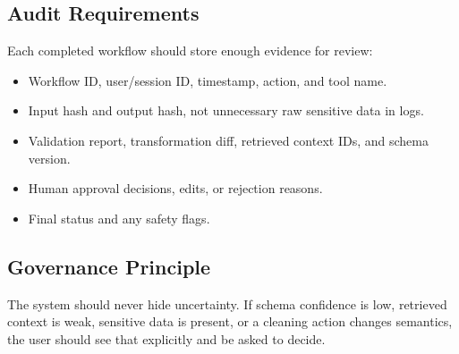 \subsection{Audit Requirements}

Each completed workflow should store enough evidence for review:

\begin{itemize}
  \item Workflow ID, user/session ID, timestamp, action, and tool name.
  \item Input hash and output hash, not unnecessary raw sensitive data in logs.
  \item Validation report, transformation diff, retrieved context IDs, and schema version.
  \item Human approval decisions, edits, or rejection reasons.
  \item Final status and any safety flags.
\end{itemize}

\subsection{Governance Principle}

The system should never hide uncertainty. If schema confidence is low, retrieved context is weak, sensitive data is present, or a cleaning action changes semantics, the user should see that explicitly and be asked to decide.
